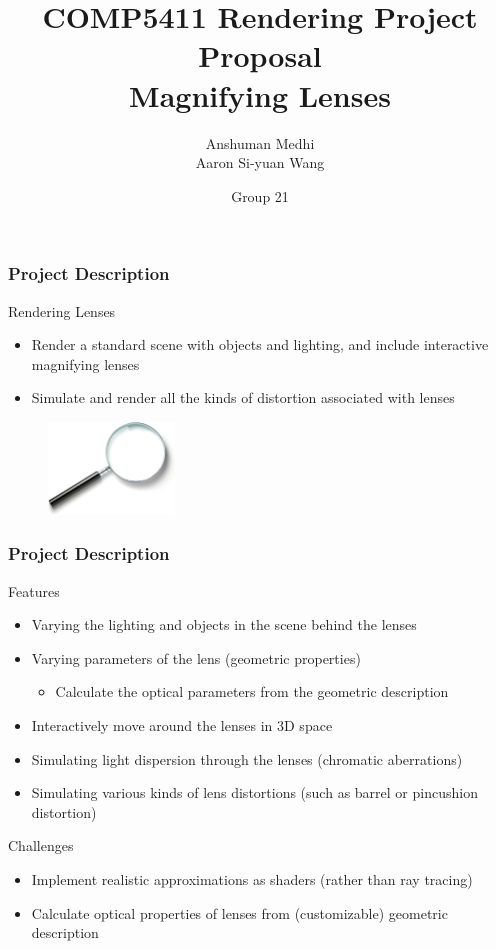 \documentclass{beamer}
\title[COMP5411 Project Proposal]{COMP5411 Rendering Project Proposal \\ Magnifying Lenses}
\author[Anshuman \& Aaron]{Anshuman Medhi \\ Aaron Si-yuan Wang}
\date{Group 21}
\begin{document}
\frame{\titlepage}

\begin{frame}
    \frametitle{Project Description}
    \begin{block}{Rendering Lenses}
       \begin{itemize}
        \item Render a standard scene with objects and lighting, and include interactive magnifying lenses
        \item Simulate and render all the kinds of distortion associated with lenses
       \end{itemize} 
    \end{block}
\begin{figure}[htpb]
    \centering
        \includegraphics[width=0.3\textwidth]{images/mag}
    \end{figure}
\end{frame}

\begin{frame}
    \frametitle{Project Description}
    \begin{block}{Features}
        \begin{itemize}
        \item Varying the lighting and objects in the scene behind the lenses
        \item Varying parameters of the lens (geometric properties)
        \begin{itemize}
            \item Calculate the optical parameters from the geometric description
        \end{itemize}
        \item Interactively move around the lenses in 3D space
        \item Simulating light dispersion through the lenses (chromatic aberrations)
        \item Simulating various kinds of lens distortions (such as barrel or pincushion distortion)
        \end{itemize}
    \end{block}
    \begin{block}{Challenges}
       \begin{itemize}
           \item Implement realistic approximations as shaders (rather than ray tracing)
           \item Calculate optical properties of lenses from (customizable) geometric description
       \end{itemize} 
    \end{block}
\end{frame}
\end{document}
